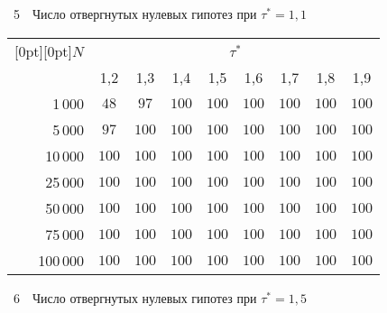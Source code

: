 \begin{multicols}{2}
\addtocounter{table}{2}
\noindent
{{\tablename~5}\ \ \small{Число отвергнутых нулевых гипотез при $\tau^*=1{,}1$}}

\vspace*{6pt}

\begin{center}
{\small 
\tabcolsep=4.8pt
\begin{tabular}{|r|c|c|c|c|c|c|c|c|}
\hline
\multicolumn{1}{|c|}{\raisebox{-6pt}[0pt][0pt]{$N$}} &\multicolumn{8}{c|}{$\tau^*$}\\
\cline{2-9}
& 1,2 & 1,3 & 1,4 & 1,5 & 1,6 & 1,7 & 1,8 & 1,9 \\ 
\hline
1\,000 & \hphantom{9}$48$ & \hphantom{9}$97$ & $100$ & $100$ & $100$ & $100$ & $100$ & $100$ \\
5\,000 & \hphantom{9}$97$ & $100$ & $100$ & $100$ & $100$ & $100$ & $100$ & $100$ \\
10\,000 & $100$ & $100$ & $100$ & $100$ & $100$ & $100$ & $100$ & $100$ \\
25\,000 & $100$ & $100$ & $100$ & $100$ & $100$ & $100$ & $100$ & $100$ \\
50\,000 & $100$ & $100$ & $100$ & $100$ & $100$ & $100$ & $100$ & $100$ \\
75\,000 & $100$ & $100$ & $100$ & $100$ & $100$ & $100$ & $100$ & $100$ \\
100\,000 & $100$ & $100$ & $100$ & $100$ & $100$ & $100$ & $100$ & $100$ \\ \hline
\end{tabular}}
\end{center}

\vspace*{6pt}

\noindent
{{\tablename~6}\ \ \small{Число отвергнутых нулевых гипотез при $\tau^*=1{,}5$\newline}}

\vspace*{6pt}


\end{multicols}
